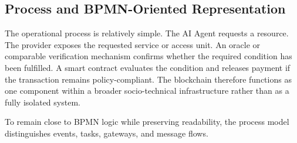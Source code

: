 \documentclass[12pt,a4paper,oneside]{article}
\theoremstyle{definition}
\theoremstyle{plain}
\begin{document}
\subsection{Process and BPMN-Oriented Representation}

The operational process is relatively simple. The AI Agent requests a resource. The provider exposes the requested service or access unit. An oracle or comparable verification mechanism confirms whether the required condition has been fulfilled. A smart contract evaluates the condition and releases payment if the transaction remains policy-compliant. The blockchain therefore functions as one component within a broader socio-technical infrastructure rather than as a fully isolated system.

To remain close to BPMN logic while preserving readability, the process model distinguishes events, tasks, gateways, and message flows.
\end{document}
